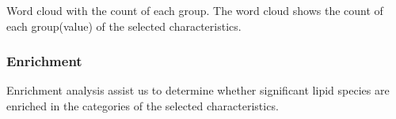 \documentclass[]{article}
\newcommand{\hlcom}[1]{\textcolor[rgb]{0.502,0.502,0.502}{\textit{#1}}}%
\newcommand{\hlopt}[1]{\textcolor[rgb]{0,0,0}{#1}}%
\newcommand{\hlstd}[1]{\textcolor[rgb]{0.251,0.251,0.251}{#1}}%
\newenvironment{Shaded}{\begin{myshaded}}{\end{myshaded}}
\newcommand{\CommentTok}[1]{\hlcom{#1}}
\newcommand{\OperatorTok}[1]{\hlopt{#1}}
\newcommand{\NormalTok}[1]{\hlstd{#1}}
\begin{document}
\begin{Shaded}
\end{Shaded}

\label{fig:unnamed-chunk-32}Word cloud with the count of each group. The word cloud shows the count of each group(value) of the selected characteristics.

\hypertarget{enrichment}{%
\subsubsection{Enrichment}\label{enrichment}}

Enrichment analysis assist us to determine whether significant lipid species are enriched in the categories of the selected characteristics.
\end{document}
